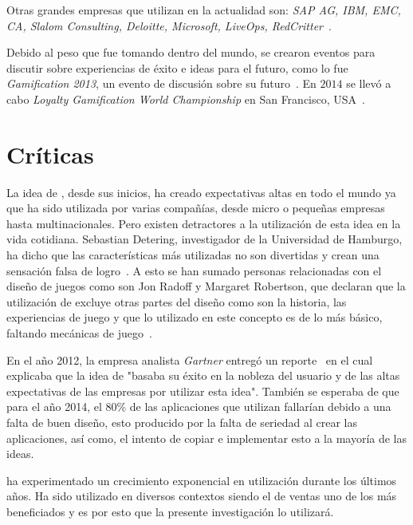 Otras grandes empresas que utilizan {\gam} en la actualidad son:
\emph{SAP AG, IBM, EMC, CA, Slalom Consulting, Deloitte, Microsoft, LiveOps,
RedCritter}~\cite{Gam:Companies:1}.

Debido al peso que {\gam} fue tomando dentro del mundo,
se crearon eventos para discutir sobre experiencias de éxito e ideas para
el futuro, como lo fue \emph{Gamification 2013},
un evento de discusión sobre su futuro~\cite{Gam:Events:1}.
En $2014$ se llevó a cabo \emph{Loyalty Gamification World Championship}
en San Francisco, USA~\cite{Gam:Events:2}. 

\section{Críticas}

La idea de {\gam}, desde sus inicios, ha creado expectativas altas en todo el mundo
ya que ha sido utilizada por varias compañías, desde micro o pequeñas empresas
hasta multinacionales.
Pero existen detractores a la utilización de esta idea en la vida cotidiana.
Sebastian Detering, investigador de la Universidad de Hamburgo, ha dicho que las
características más utilizadas no son divertidas y crean una sensación falsa de
logro~\cite{Gam:Crit:1}.
A esto se han sumado personas relacionadas con el diseño de juegos como son
Jon Radoff y Margaret Robertson,  que declaran que la utilización de {\gam}
excluye otras partes del diseño como son la historia, las experiencias de juego
y que lo utilizado en este concepto es de lo más básico, faltando mecánicas de
juego~\cite{Gam:Crit:2}.

En el año 2012, la empresa analista \emph{Gartner} entregó un
reporte~\cite{Gam:Crit:3} en el cual explicaba que la idea de {\gam}
"basaba su éxito en la nobleza del usuario y de las altas expectativas
de las empresas por utilizar esta idea".
También se esperaba de que para el año 2014, el 80\% de las aplicaciones
que utilizan {\gam} fallarían debido a una falta de buen diseño,
esto producido por la falta de seriedad al crear las aplicaciones,
así como, el intento de copiar e implementar esto a la mayoría de las ideas.

{\GAM} ha experimentado un crecimiento exponencial en utilización durante los últimos 
años. Ha sido utilizado en diversos contextos siendo el de ventas uno de los más beneficiados
 y es por esto que la presente investigación lo utilizará.

